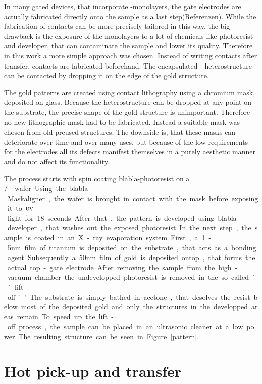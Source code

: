 In many gated devices, that incorporate \tmd-monolayers, the gate electrodes are actually fabricated directly onto the sample as a last step(Referenzen). While the fabrication of contacts can be more precisely tailored in this way, the big drawback is the exposure of the monolayers to a lot of chemicals like photoresist and developer, that can contaminate the sample and lower its quality. Therefore in this work a more simple approach was chosen. Instead of writing contacts after transfer, contacts are fabricated beforehand. The encapsulated \hbn-\tmd-heterostructure can be contacted by dropping it on the edge of the gold structure.

The gold patterns are created using contact lithography using a chromium mask, deposited on glass. Because the heterostructure can be dropped at any point on the substrate, the precise shape of the gold structure is unimportant. Therefore no new lithographic mask had to be fabricated. Instead a suitable mask was chosen from old preused structures. The downside is, that these masks can deteriorate over time and over many uses, but because of the low requirements for the electrodes all its defects manifest themselves in a purely aesthetic manner and do not affect its functionality.

The process starts with spin coating blabla-photoresist on a \si/\sio wafer. Using the blabla-Maskaligner, the wafer is brought in contact with the mask before exposing it to \textsc{uv}-light for 18 seconds. After that, the pattern is developed using blabla-developer, that washes out the exposed photoresist.

In the next step, the sample is coated in an X-ray evaporation system. First, a 1-5nm film of titanium is deposited on the substrate, that acts as a bonding agent. Subsequently a 50nm film of gold is deposited ontop, that forms the actual top-gate electrode. After removing the sample from the high-vacuum chamber the undevelopped photoresist is removed in the so called ``lift-off''. The substrate is simply bathed in acetone, that desolves the resist below most of the deposited gold and only the structures in the developped areas remain. To speed up the lift-off process, the sample can be placed in an ultrasonic cleaner at a low power.

The resulting structure can be seen in Figure \ref{pattern}. 

\section{Hot pick-up and transfer}

